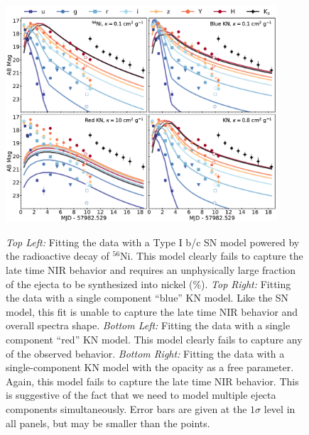 \begin{figure}
\begin{center}
\hspace*{-0.1in}
\scalebox{1.}
{\includegraphics[width=0.9\textwidth]{./figs/chapter5/lc_failed_alt.pdf}}
\caption{{\it Top Left:} Fitting the data with a Type I b/c SN model powered by the radioactive decay of $^{56}$Ni. This model clearly fails to capture the late time NIR behavior and requires an unphysically large fraction of the ejecta to be synthesized into nickel (\%). {\it Top Right:} Fitting the data with a single component ``blue'' KN model. Like the SN model, this fit is unable to capture the late time NIR behavior and overall spectra shape. {\it Bottom Left:} Fitting the data with a single component ``red'' KN model. This model clearly fails to capture any of the observed behavior. {\it Bottom Right:} Fitting the data with a single-component KN model with the opacity as a free parameter. Again, this model fails to capture the late time NIR behavior. This is suggestive of the fact that we need to model multiple ejecta components simultaneously. Error bars are given at the $1\sigma$ level in all panels, but may be smaller than the points.}
\label{fig:ch5_lc_failed}
\end{center}
\end{figure}

